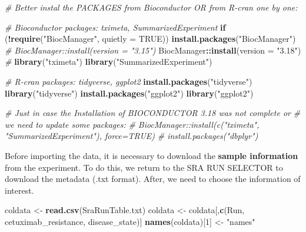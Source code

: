 \documentclass[
]{article}
\newenvironment{Shaded}{\begin{snugshade}}{\end{snugshade}}
\newcommand{\AttributeTok}[1]{\textcolor[rgb]{0.13,0.29,0.53}{#1}}
\newcommand{\CommentTok}[1]{\textcolor[rgb]{0.56,0.35,0.01}{\textit{#1}}}
\newcommand{\ConstantTok}[1]{\textcolor[rgb]{0.56,0.35,0.01}{#1}}
\newcommand{\ControlFlowTok}[1]{\textcolor[rgb]{0.13,0.29,0.53}{\textbf{#1}}}
\newcommand{\DecValTok}[1]{\textcolor[rgb]{0.00,0.00,0.81}{#1}}
\newcommand{\FunctionTok}[1]{\textcolor[rgb]{0.13,0.29,0.53}{\textbf{#1}}}
\newcommand{\NormalTok}[1]{#1}
\newcommand{\OtherTok}[1]{\textcolor[rgb]{0.56,0.35,0.01}{#1}}
\newcommand{\SpecialCharTok}[1]{\textcolor[rgb]{0.81,0.36,0.00}{\textbf{#1}}}
\newcommand{\StringTok}[1]{\textcolor[rgb]{0.31,0.60,0.02}{#1}}
\begin{document}
\begin{Shaded}
\begin{Highlighting}[]
\CommentTok{\# Better instal the PACKAGES from Bioconductor OR from R{-}cran one by one:}

\CommentTok{\# Bioconductor packages: tximeta, SummarizedExperiment}
\ControlFlowTok{if}\NormalTok{ (}\SpecialCharTok{!}\FunctionTok{require}\NormalTok{(}\StringTok{"BiocManager"}\NormalTok{, }\AttributeTok{quietly =} \ConstantTok{TRUE}\NormalTok{))}
    \FunctionTok{install.packages}\NormalTok{(}\StringTok{"BiocManager"}\NormalTok{) }
\CommentTok{\# BiocManager::install(version = "3.15")}
\NormalTok{BiocManager}\SpecialCharTok{::}\FunctionTok{install}\NormalTok{(}\AttributeTok{version =} \StringTok{"3.18"}\NormalTok{)}
\CommentTok{\#}
\FunctionTok{library}\NormalTok{(}\StringTok{"tximeta"}\NormalTok{) }
\FunctionTok{library}\NormalTok{(}\StringTok{"SummarizedExperiment"}\NormalTok{) }

\CommentTok{\# R{-}cran packages: tidyverse, ggplot2 }
\FunctionTok{install.packages}\NormalTok{(}\StringTok{"tidyverse"}\NormalTok{)}
\FunctionTok{library}\NormalTok{(}\StringTok{"tidyverse"}\NormalTok{)}
\FunctionTok{install.packages}\NormalTok{(}\StringTok{"ggplot2"}\NormalTok{)}
\FunctionTok{library}\NormalTok{(}\StringTok{"ggplot2"}\NormalTok{)}

\CommentTok{\# Just in case the Installation of BIOCONDUCTOR 3.18 was not complete or }
\CommentTok{\# we need to update some packages:}
\CommentTok{\# BiocManager::install(c("tximeta", "SummarizedExperiment"), force=TRUE)}
\CommentTok{\# install.packages("dbplyr")}
\end{Highlighting}
\end{Shaded}

Before importing the data, it is necessary to download the
\textbf{sample information} from the experiment. To do this, we return
to the SRA RUN SELECTOR to download the metadata (.txt format). After,
we need to choose the information of interest.

\begin{Shaded}
\begin{Highlighting}[]
\NormalTok{coldata }\OtherTok{\textless{}{-}} \FunctionTok{read.csv}\NormalTok{(}\StringTok{\textquotesingle{}SraRunTable.txt\textquotesingle{}}\NormalTok{)}
\NormalTok{coldata }\OtherTok{\textless{}{-}}\NormalTok{ coldata[,}\FunctionTok{c}\NormalTok{(}\StringTok{\textquotesingle{}Run\textquotesingle{}}\NormalTok{, }\StringTok{\textquotesingle{}cetuximab\_resistance\textquotesingle{}}\NormalTok{, }\StringTok{\textquotesingle{}disease\_state\textquotesingle{}}\NormalTok{)]}
\FunctionTok{names}\NormalTok{(coldata)[}\DecValTok{1}\NormalTok{] }\OtherTok{\textless{}{-}} \StringTok{"names"}
\end{Highlighting}
\end{Shaded}
\end{document}
